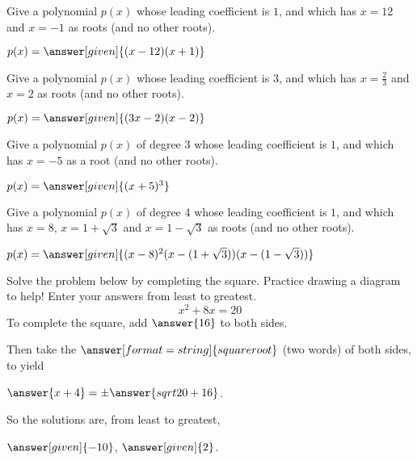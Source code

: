 \documentclass[nooutcomes]{ximera}
\begin{document}
\begin{problem}
Give a polynomial $p(x)$ whose leading coefficient is $1$, and which has $x=12$ and $x=-1$ as roots (and no other roots).

\begin{prompt}
	$p(x) = \answer[given]{(x-12)(x+1)}$
\end{prompt}
\end{problem}


\begin{problem}
Give a polynomial $p(x)$ whose leading coefficient is $3$, and which has $x=\frac{2}{3}$ and $x=2$ as roots (and no other roots).

\begin{prompt}
	$p(x) = \answer[given]{(3x-2)(x-2)}$
\end{prompt}
\end{problem}



\begin{problem}
Give a polynomial $p(x)$ of degree 3 whose leading coefficient is $1$, and which has $x=-5$ as a root (and no other roots).

\begin{prompt}
	$p(x) = \answer[given]{(x+5)^3}$
\end{prompt}
\end{problem}




\begin{problem}
Give a polynomial $p(x)$ of degree 4 whose leading coefficient is $1$, and which has $x=8$, $x=1+\sqrt{3}$ and $x = 1-\sqrt{3}$ as roots (and no other roots).

\begin{prompt}
	$p(x) = \answer[given]{(x-8)^2(x-(1+\sqrt{3}))(x-(1-\sqrt{3}))}$
\end{prompt}
\end{problem}



\begin{problem}
Solve the problem below by completing the square.  Practice drawing a diagram to help! Enter your answers from least to greatest.
\[
x^2 + 8x = 20
\]
To complete the square, add $\answer{16}$ to both sides.  
\begin{problem}
Then take the $\answer[format=string]{square root}$ (two words) of both sides, to yield
\begin{prompt}
$\answer{x+4} = \pm \answer{sqrt{20+16}}$.
\end{prompt}

So the solutions are, from least to greatest,
\begin{prompt}
	$\answer[given]{-10}$, $\answer[given]{2}$.
\end{prompt}
\end{problem}
\end{problem}
\end{document}

